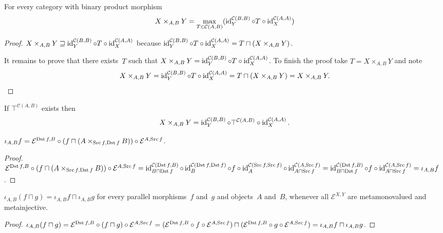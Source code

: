 \begin{prop}
For every category with binary product morphism
\[X\times_{A,B}Y=
\max_{T\in\mathcal{C}(A,B)}(\operatorname{id}^{\mathcal{C}(B,B)}_Y\circ T\circ\operatorname{id}^{\mathcal{C}(A,A)}_X)\]
\end{prop}

\begin{proof}
$X\times_{A,B}Y\sqsupseteq
\operatorname{id}^{\mathcal{C}(B,B)}_Y\circ T\circ\operatorname{id}^{\mathcal{C}(A,A)}_X$
because
$\operatorname{id}^{\mathcal{C}(B,B)}_Y\circ T\circ\operatorname{id}^{\mathcal{C}(A,A)}_X=
T\sqcap(X\times_{A,B}Y)$.

It remains to prove that there exists~$T$ such that
$X\times_{A,B}Y=\operatorname{id}^{\mathcal{C}(B,B)}_Y\circ T\circ\operatorname{id}^{\mathcal{C}(A,A)}_X$.
To finish the proof take $T=X\times_{A,B}Y$ and note
\[X\times_{A,B}Y=\operatorname{id}^{\mathcal{C}(B,B)}_Y\circ T\circ\operatorname{id}^{\mathcal{C}(A,A)}_X =
T\sqcap(X\times_{A,B}Y)=X\times_{A,B}Y.\]
\end{proof}

\begin{cor}
If $\top^{\mathcal{C}(A,B)}$ exists then
\[X\times_{A,B}Y=
\operatorname{id}^{\mathcal{C}(B,B)}_Y\circ\top^{\mathcal{C}(A,B)}\circ\operatorname{id}^{\mathcal{C}(A,A)}_X.\]
\end{cor}

\begin{prop}
$\iota_{A,B}f=
\mathcal{E}^{\operatorname{Dst} f,B}\circ
(f\sqcap(A\times_{\operatorname{Src} f,\operatorname{Dst} f}B))\circ
\mathcal{E}^{A,\operatorname{Src} f}$.
\end{prop}

\begin{proof}
$\mathcal{E}^{\operatorname{Dst} f,B}\circ
(f\sqcap(A\times_{\operatorname{Src} f,\operatorname{Dst} f}B))\circ
\mathcal{E}^{A,\operatorname{Src} f}=
\operatorname{id}^{\mathcal{C}(\operatorname{Dst} f,B)}_{B\sqcap\operatorname{Dst} f}\circ
\operatorname{id}^{\mathcal{C}(\operatorname{Dst} f,\operatorname{Dst} f)}_B\circ f\circ
\operatorname{id}^{\mathcal{C}(\operatorname{Src} f,\operatorname{Src} f)}_A\circ
\operatorname{id}^{\mathcal{C}(A,\operatorname{Src} f)}_{A\sqcap\operatorname{Src} f}=
\operatorname{id}^{\mathcal{C}(\operatorname{Dst} f,B)}_{B\sqcap\operatorname{Dst} f}\circ
f\circ
\operatorname{id}^{\mathcal{C}(A,\operatorname{Src} f)}_{A\sqcap\operatorname{Src} f}=
\iota_{A,B}f$.
\end{proof}

\begin{prop}
$\iota_{A,B}(f\sqcap g)=\iota_{A,B}f\sqcap\iota_{A,B}g$
for every parallel morphisms~$f$ and~$g$ and objects~$A$
and~$B$, whenever all $\mathcal{E}^{X,Y}$ are metamonovalued
and metainjective.
\end{prop}

\begin{proof}
$\iota_{A,B}(f\sqcap g)=
\mathcal{E}^{\operatorname{Dst} f,B}\circ(f\sqcap g)\circ
\mathcal{E}^{A,\operatorname{Src} f}=
(\mathcal{E}^{\operatorname{Dst} f,B}\circ f\circ\mathcal{E}^{A,\operatorname{Src} f})\sqcap
(\mathcal{E}^{\operatorname{Dst} f,B}\circ g\circ\mathcal{E}^{A,\operatorname{Src} f})=
\iota_{A,B}f\sqcap\iota_{A,B}g$.
\end{proof}


